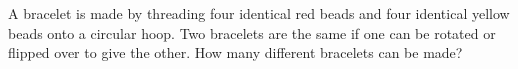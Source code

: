 A bracelet is made by threading four identical red beads and four identical yellow beads onto a circular hoop. Two bracelets are the same if one can be rotated or flipped over to give the other. How many different bracelets can be made?
